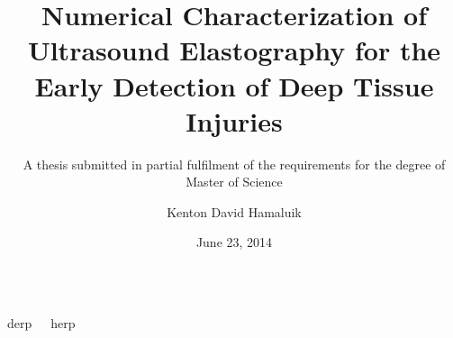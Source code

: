 \documentclass[final]{beamer}
\title{Numerical Characterization of Ultrasound Elastography for the Early Detection of Deep Tissue Injuries}
\subtitle{A thesis submitted in partial fulfilment of the requirements for the degree of Master of Science}
\author{Kenton David Hamaluik}
\institute{University of Alberta}
\date{June 23, 2014}
\begin{document}
	\begin{frame}
		\begin{columns}[c]
			\fontsize{28}{33.6}\selectfont\rmfamily

			derp

			herp
		\end{columns}
	\end{frame}
\end{document}
